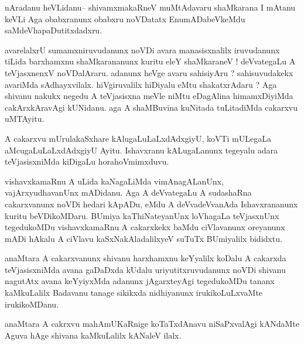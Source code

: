 \documentclass{article}
\begin{document}
\begin{mn}%
nAradanu heVLidanu-- shivamxmakaRneV muMtAdavaru shaMkarana I mAtanu keVLi Aga obabxranunx 
obabxru noVDatatx EnumADabeVkeMdu saMdeVhapaDutitxdadxru.
\end{mn}

\begin{mn}%
avarelalxrU sumamxniruvudanunx noVDi avara manasisxnalilx iruvudanunx tiLida barxhamxnu 
shaMkarananunx kuritu eleY shaMkaraneV ! deVvategaLu A teVjasxnenxV noVDalAraru. adanunx 
heVge avaru sahisiyAru ? sahisuvudakekx avariMda sAdhayxvilalx. hiVgiruvalilx hiDiyalu eMtu 
shakatxrAdaru ? Aga shivanu nakukx negedu A teVjasisxna meVle niMtu eDagAlina himamxDiyiMda 
cakArxkAravAgi kUNidanu. aga A shaMBuvina kuNitada tuLitadiMda cakarxvu uMTAyitu.
\end{mn}

\begin{mn}%
A cakarxvu mUrulakaSxhare kAlugaLuLaLxdAdxgiyU, koVTi mULegaLa aMcugaLuLaLxdAdxgiyU Ayitu. 
Ishavxranu kALugaLanunx tegeyalu adara teVjasisxniMda kiDigaLu horahoVmimxduvu.
\end{mn}

\begin{mn}%
vishavxkamaRnu A uLida kaNagaLiMda vimAnagALanUnx, vajArxyudhavanUnx mADidanu. Aga A 
deVvategaLu A sudashaRna cakarxvanunx noVDi hedari kApADu, eMdu A deVvadeVvanAda 
Ishavxrananunx kuritu beVDikoMDaru. BUmiya kaThiNateyanUnx loVhagaLa teVjasxnUnx 
tegedukoMDu vishavxkamaRnu A cakarxkekx baMdu ciVlavanunx oreyanunx mADi hAkalu A ciVlavu 
kaSxNakAladalilxyeV suTuTx BUmiyalilx bididxtu.
\end{mn}

\begin{mn}%
anaMtara A cakarxvanunx shivanu harxhamxnu keYyalilx koDalu A cakarxda teVjasisxniMda avana 
gaDaDxda kUdalu uriyutitxruvudanunx noVDi shivanu nagutAtx avana keYyiyxMda adanunx 
jAgarxteyAgi tegedukoMDu tananx kaMkuLalilx Badavanu tanage sikikxda nidhiyanunx 
irukikoLuLxvaMte irukikoMDanu.
\end{mn}

\begin{mn}%
anaMtara A cakrxvu mahAmUKaRnige koTaTxdAnavu niSaPxvalAgi kANdaMte Aguva hAge shivana 
kaMkuLalilx kANaleV ilalx.
\end{mn}

\end{document}
